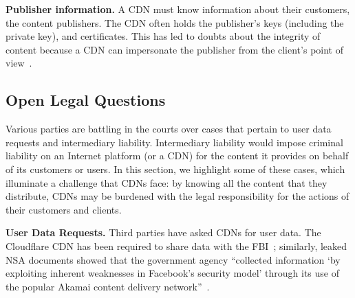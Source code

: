 \textbf{Publisher information.} A CDN must know information
about their customers, the content publishers. The CDN often holds the publisher's keys (including the private key), and certificates.  This has led to doubts 
about the integrity of content because a CDN can impersonate the publisher from the client's point of view~\cite{levy2015stickler}.



\subsection{Open Legal Questions}

Various parties are battling in the courts over cases that pertain to user
data requests and intermediary liability.  Intermediary liability would impose
criminal liability on an Internet platform (or a CDN) for the content it
provides on behalf of its customers or users. In this section, we highlight
some of these cases, which illuminate a challenge that CDNs face: by knowing
all the content that they distribute, CDNs may be burdened with the legal
responsibility for the actions of their customers and clients.

\textbf{User Data Requests.} Third parties have asked CDNs for user data. The Cloudflare CDN has been required
to share data with the FBI~\cite{cloudflare_nsl}; similarly, leaked NSA documents showed that the government agency ``collected information `by exploiting inherent 
weaknesses in Facebook's security model' through its use of the popular Akamai content
delivery network''~\cite{facebook_surv}.

